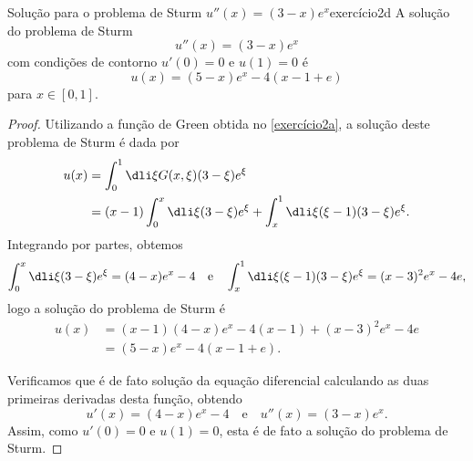 \begin{proposition}{Solução para o problema de Sturm \(u''(x) = (3 - x)e^x\)}{exercício2d}
    A solução do problema de Sturm
    \begin{equation*}
        u''(x) = (3-x)e^x
    \end{equation*}
    com condições de contorno \(u'(0) = 0\) e \(u(1) = 0\) é
    \begin{equation*}
        u(x) = (5-x)e^x - 4(x - 1 + e)
    \end{equation*}
    para \(x \in [0,1]\).
\end{proposition}
\begin{proof}
    Utilizando a função de Green obtida no \cref{exercício2a}, a solução deste problema de Sturm é dada por
    \begin{align*}
        u(x) &= \int_{0}^{1}\dli\xi G(x,\xi) (3-\xi)e^\xi\\
             &= (x - 1)\int_0^x \dli\xi (3-\xi)e^\xi + \int_x^1 \dli\xi (\xi - 1)(3-\xi)e^{\xi}.
    \end{align*}
    Integrando por partes, obtemos
    \begin{equation*}
        \int_0^x \dli\xi (3-\xi)e^\xi = (4 - x)e^x - 4\quad\text{e}\quad \int_x^1 \dli\xi(\xi - 1)(3 -\xi)e^\xi = (x - 3)^2e^x - 4e,
    \end{equation*}
    logo a solução do problema de Sturm é
    \begin{align*}
        u(x) &= (x - 1)(4-x)e^x - 4(x-1) + (x - 3)^2e^x - 4e\\
             &= (5 - x)e^x - 4(x - 1 + e).
    \end{align*}

    Verificamos que é de fato solução da equação diferencial calculando as duas primeiras derivadas desta função, obtendo
    \begin{equation*}
        u'(x) = (4 - x)e^x - 4\quad\text{e}\quad u''(x) = (3 - x)e^x.
    \end{equation*}
    Assim, como \(u'(0) = 0\) e \(u(1) = 0\), esta é de fato a solução do problema de Sturm.
\end{proof}
